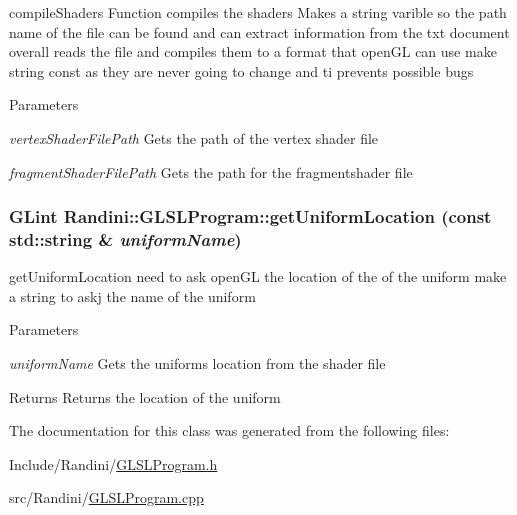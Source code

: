 compileShaders Function compiles the shaders Makes a string varible so the path name of the file can be found and can extract information from the txt document overall reads the file and compiles them to a format that openGL can use make string const as they are never going to change and ti prevents possible bugs 
\begin{DoxyParams}{Parameters}
\item[{\em vertexShaderFilePath}]Gets the path of the vertex shader file \item[{\em fragmentShaderFilePath}]Gets the path for the fragmentshader file \end{DoxyParams}
\hypertarget{classRandini_1_1GLSLProgram_a8ed1430de4e2629d6dcddf8eafd6ce09}{
\subsubsection[{getUniformLocation}]{\setlength{\rightskip}{0pt plus 5cm}GLint Randini::GLSLProgram::getUniformLocation (const std::string \& {\em uniformName})}}
\label{classRandini_1_1GLSLProgram_a8ed1430de4e2629d6dcddf8eafd6ce09}


getUniformLocation need to ask openGL the location of the of the uniform make a string to askj the name of the uniform 
\begin{DoxyParams}{Parameters}
\item[{\em uniformName}]Gets the uniforms location from the shader file \end{DoxyParams}
\begin{DoxyReturn}{Returns}
Returns the location of the uniform 
\end{DoxyReturn}


The documentation for this class was generated from the following files:\begin{DoxyCompactItemize}
\item 
Include/Randini/\hyperlink{GLSLProgram_8h}{GLSLProgram.h}\item 
src/Randini/\hyperlink{GLSLProgram_8cpp}{GLSLProgram.cpp}\end{DoxyCompactItemize}
